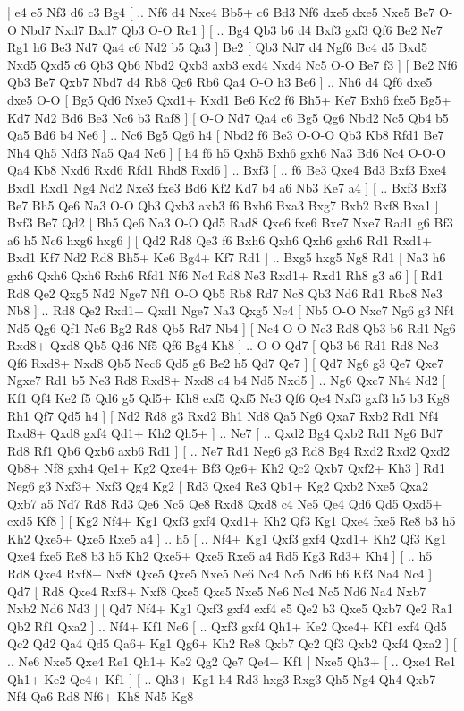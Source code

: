 \makegametitle 
|   e4   e5    Nf3   d6    c3   Bg4 [ .. Nf6  d4 Nxe4  Bb5+ c6  Bd3 Nf6  dxe5 dxe5  Nxe5 Be7  O-O Nbd7  Nxd7 Bxd7  Qb3 O-O  Re1   ]  [ .. Bg4  Qb3 b6  d4 Bxf3  gxf3 Qf6  Be2 Ne7  Rg1 h6  Be3 Nd7  Qa4 c6  Nd2 b5  Qa3   ]  Be2 [  Qb3 Nd7  d4 Ngf6  Bc4 d5  Bxd5 Nxd5  Qxd5 c6  Qb3 Qb6  Nbd2 Qxb3  axb3 exd4  Nxd4 Nc5  O-O Be7  f3   ]  [  Be2 Nf6  Qb3 Be7  Qxb7 Nbd7  d4 Rb8  Qc6 Rb6  Qa4 O-O  h3 Be6   ] .. Nh6    d4   Qf6    dxe5   dxe5    O-O [  Bg5 Qd6  Nxe5 Qxd1+  Kxd1 Be6  Kc2 f6  Bh5+ Ke7  Bxh6 fxe5  Bg5+ Kd7  Nd2 Bd6  Be3 Nc6  b3 Raf8   ]  [  O-O Nd7  Qa4 c6  Bg5 Qg6  Nbd2 Nc5  Qb4 b5  Qa5 Bd6  b4 Ne6   ] .. Nc6    Bg5   Qg6    h4 [  Nbd2 f6  Be3 O-O-O  Qb3 Kb8  Rfd1 Be7  Nh4 Qh5  Ndf3 Na5  Qa4 Nc6   ]  [  h4 f6  h5 Qxh5  Bxh6 gxh6  Na3 Bd6  Nc4 O-O-O  Qa4 Kb8  Nxd6 Rxd6  Rfd1 Rhd8  Rxd6   ] .. Bxf3 [ .. f6  Be3 Qxe4  Bd3 Bxf3  Bxe4 Bxd1  Rxd1 Ng4  Nd2 Nxe3  fxe3 Bd6  Kf2 Kd7  b4 a6  Nb3 Ke7  a4   ]  [ .. Bxf3  Bxf3 Be7  Bh5 Qe6  Na3 O-O  Qb3 Qxb3  axb3 f6  Bxh6 Bxa3  Bxg7 Bxb2  Bxf8 Bxa1   ]  Bxf3   Be7    Qd2 [  Bh5 Qe6  Na3 O-O  Qd5 Rad8  Qxe6 fxe6  Bxe7 Nxe7  Rad1 g6  Bf3 a6  h5 Nc6  hxg6 hxg6   ]  [  Qd2 Rd8  Qe3 f6  Bxh6 Qxh6  Qxh6 gxh6  Rd1 Rxd1+  Bxd1 Kf7  Nd2 Rd8  Bh5+ Ke6  Bg4+ Kf7  Rd1   ] .. Bxg5    hxg5   Ng8    Rd1 [  Na3 h6  gxh6 Qxh6  Qxh6 Rxh6  Rfd1 Nf6  Nc4 Rd8  Ne3 Rxd1+  Rxd1 Rh8  g3 a6   ]  [  Rd1 Rd8  Qe2 Qxg5  Nd2 Nge7  Nf1 O-O  Qb5 Rb8  Rd7 Nc8  Qb3 Nd6  Rd1 Rbc8  Ne3 Nb8   ] .. Rd8    Qe2   Rxd1+    Qxd1   Nge7    Na3   Qxg5    Nc4 [  Nb5 O-O  Nxc7 Ng6  g3 Nf4  Nd5 Qg6  Qf1 Ne6  Bg2 Rd8  Qb5 Rd7  Nb4   ]  [  Nc4 O-O  Ne3 Rd8  Qb3 b6  Rd1 Ng6  Rxd8+ Qxd8  Qb5 Qd6  Nf5 Qf6  Bg4 Kh8   ] .. O-O    Qd7 [  Qb3 b6  Rd1 Rd8  Ne3 Qf6  Rxd8+ Nxd8  Qb5 Nec6  Qd5 g6  Be2 h5  Qd7 Qe7   ]  [  Qd7 Ng6  g3 Qe7  Qxe7 Ngxe7  Rd1 b5  Ne3 Rd8  Rxd8+ Nxd8  c4 b4  Nd5 Nxd5   ] .. Ng6    Qxc7   Nh4    Nd2 [  Kf1 Qf4  Ke2 f5  Qd6 g5  Qd5+ Kh8  exf5 Qxf5  Ne3 Qf6  Qe4 Nxf3  gxf3 h5  b3 Kg8  Rh1 Qf7  Qd5 h4   ]  [  Nd2 Rd8  g3 Rxd2  Bh1 Nd8  Qa5 Ng6  Qxa7 Rxb2  Rd1 Nf4  Rxd8+ Qxd8  gxf4 Qd1+  Kh2 Qh5+   ] .. Ne7 [ .. Qxd2  Bg4 Qxb2  Rd1 Ng6  Bd7 Rd8  Rf1 Qb6  Qxb6 axb6  Rd1   ]  [ .. Ne7  Rd1 Neg6  g3 Rd8  Bg4 Rxd2  Rxd2 Qxd2  Qb8+ Nf8  gxh4 Qe1+  Kg2 Qxe4+  Bf3 Qg6+  Kh2 Qc2  Qxb7 Qxf2+  Kh3   ]  Rd1   Neg6    g3   Nxf3+    Nxf3   Qg4    Kg2 [  Rd3 Qxe4  Re3 Qb1+  Kg2 Qxb2  Nxe5 Qxa2  Qxb7 a5  Nd7 Rd8  Rd3 Qe6  Nc5 Qe8  Rxd8 Qxd8  c4 Ne5  Qe4 Qd6  Qd5 Qxd5+  cxd5 Kf8   ]  [  Kg2 Nf4+  Kg1 Qxf3  gxf4 Qxd1+  Kh2 Qf3  Kg1 Qxe4  fxe5 Re8  b3 h5  Kh2 Qxe5+  Qxe5 Rxe5  a4   ] .. h5 [ .. Nf4+  Kg1 Qxf3  gxf4 Qxd1+  Kh2 Qf3  Kg1 Qxe4  fxe5 Re8  b3 h5  Kh2 Qxe5+  Qxe5 Rxe5  a4 Rd5  Kg3 Rd3+  Kh4   ]  [ .. h5  Rd8 Qxe4  Rxf8+ Nxf8  Qxe5 Qxe5  Nxe5 Ne6  Nc4 Nc5  Nd6 b6  Kf3 Na4  Nc4   ]  Qd7 [  Rd8 Qxe4  Rxf8+ Nxf8  Qxe5 Qxe5  Nxe5 Ne6  Nc4 Nc5  Nd6 Na4  Nxb7 Nxb2  Nd6 Nd3   ]  [  Qd7 Nf4+  Kg1 Qxf3  gxf4 exf4  e5 Qe2  b3 Qxe5  Qxb7 Qe2  Ra1 Qb2  Rf1 Qxa2   ] .. Nf4+    Kf1   Ne6 [ .. Qxf3  gxf4 Qh1+  Ke2 Qxe4+  Kf1 exf4  Qd5 Qc2  Qd2 Qa4  Qd5 Qa6+  Kg1 Qg6+  Kh2 Re8  Qxb7 Qc2  Qf3 Qxb2  Qxf4 Qxa2   ]  [ .. Ne6  Nxe5 Qxe4  Re1 Qh1+  Ke2 Qg2  Qe7 Qe4+  Kf1   ]  Nxe5   Qh3+ [ .. Qxe4  Re1 Qh1+  Ke2 Qe4+  Kf1   ]  [ .. Qh3+  Kg1 h4  Rd3 hxg3  Rxg3 Qh5  Ng4 Qh4  Qxb7 Nf4  Qa6 Rd8  Nf6+ Kh8  Nd5 Kg8  